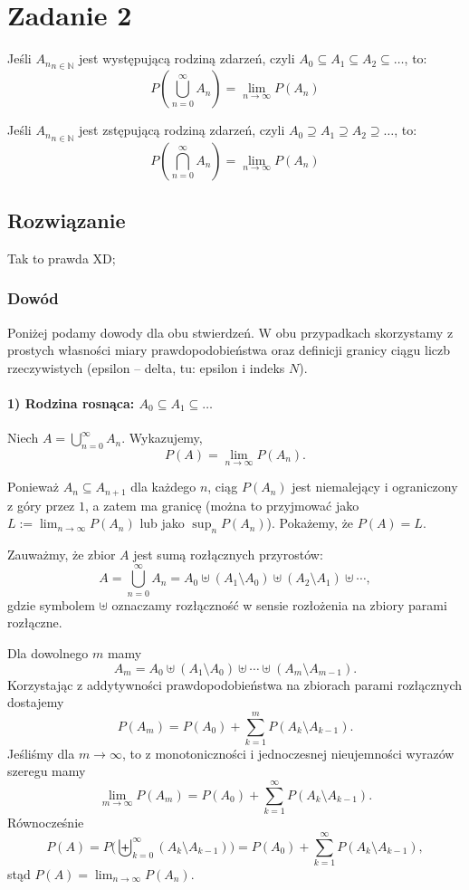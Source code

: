 \section{Zadanie 2}
Jeśli \({A_n}_{n\in \mathbb{N}}\) jest występującą rodziną zdarzeń, czyli
\(A_0 \subseteq A_1 \subseteq A_2 \subseteq \ldots\), to:
\[
	P\left(\bigcup_{n=0}^{\infty} A_n\right) = \lim_{n \to \infty} P(A_n)
\]

Jeśli \({A_n}_{n\in \mathbb{N}}\) jest zstępującą rodziną zdarzeń, czyli
\(A_0 \supseteq A_1 \supseteq A_2 \supseteq \ldots\), to:
\[
	P\left(\bigcap_{n=0}^{\infty} A_n\right) = \lim_{n \to \infty} P(A_n)
\]


\subsection*{Rozwiązanie}
Tak to prawda XD;

\subsubsection*{Dowód}
Poniżej podamy dowody dla obu stwierdzeń. W obu przypadkach skorzystamy z prostych własności miary prawdopodobieństwa oraz definicji granicy ciągu liczb rzeczywistych (epsilon -- delta, tu: epsilon i indeks \(N\)).

\paragraph{1) Rodzina rosnąca: \(A_0\subseteq A_1\subseteq\ldots\)}

Niech \(A=\bigcup_{n=0}^{\infty}A_n\). Wykazujemy,
\[P(A)=\lim_{n\to\infty}P(A_n).\]

Ponieważ \(A_n\subseteq A_{n+1}\) dla każdego \(n\), ciąg \(P(A_n)\) jest niemalejący i ograniczony z góry przez \(1\), a zatem ma granicę (można to przyjmować jako \(L:=\lim_{n\to\infty}P(A_n)\) lub jako \(\sup_n P(A_n)\)). Pokażemy, że \(P(A)=L\).

Zauważmy, że zbior \(A\) jest sumą rozłącznych przyrostów:
\[A=\bigcup_{n=0}^{\infty}A_n= A_0\uplus (A_1\setminus A_0)\uplus (A_2\setminus A_1)\uplus\cdots,\]
gdzie symbolem \(\uplus\) oznaczamy rozłączność w sensie rozłożenia na zbiory parami rozłączne.

Dla dowolnego \(m\) mamy
\[A_m = A_0\uplus (A_1\setminus A_0)\uplus\cdots\uplus (A_m\setminus A_{m-1}).\]
Korzystając z addytywności prawdopodobieństwa na zbiorach parami rozłącznych dostajemy
\[P(A_m)=P(A_0)+\sum_{k=1}^m P(A_k\setminus A_{k-1}).\]
Jeśliśmy dla \(m\to\infty\), to z monotoniczności i jednoczesnej nieujemności wyrazów szeregu mamy
\[\lim_{m\to\infty}P(A_m)=P(A_0)+\sum_{k=1}^{\infty} P(A_k\setminus A_{k-1}).\]
Równocześnie
\[P(A)=P\Big(\biguplus_{k=0}^{\infty} (A_k\setminus A_{k-1})\Big)=P(A_0)+\sum_{k=1}^{\infty} P(A_k\setminus A_{k-1}),\]
stąd \(P(A)=\lim_{n\to\infty}P(A_n)\).


